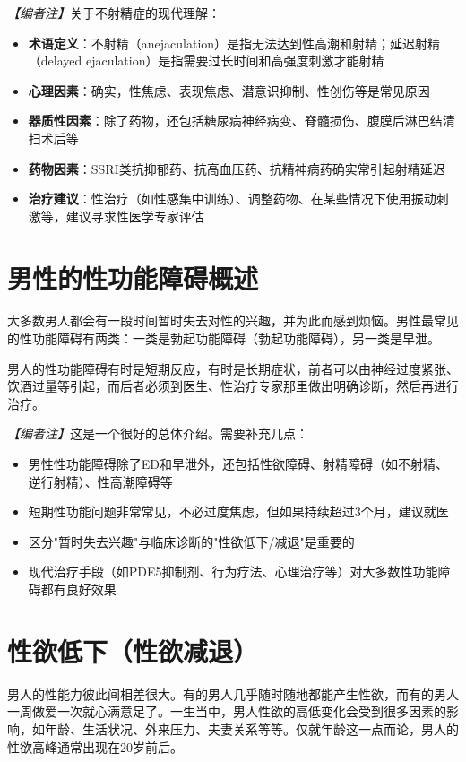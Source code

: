 \noindent\textit{【编者注】}关于不射精症的现代理解：
\begin{itemize}
	\item \textbf{术语定义}：不射精（anejaculation）是指无法达到性高潮和射精；延迟射精（delayed ejaculation）是指需要过长时间和高强度刺激才能射精
	\item \textbf{心理因素}：确实，性焦虑、表现焦虑、潜意识抑制、性创伤等是常见原因
	\item \textbf{器质性因素}：除了药物，还包括糖尿病神经病变、脊髓损伤、腹膜后淋巴结清扫术后等
	\item \textbf{药物因素}：SSRI类抗抑郁药、抗高血压药、抗精神病药确实常引起射精延迟
	\item \textbf{治疗建议}：性治疗（如性感集中训练）、调整药物、在某些情况下使用振动刺激等，建议寻求性医学专家评估
\end{itemize}

\section{男性的性功能障碍概述}

大多数男人都会有一段时间暂时失去对性的兴趣，并为此而感到烦恼。男性最常见的性功能障碍有两类：一类是勃起功能障碍（勃起功能障碍），另一类是早泄。

男人的性功能障碍有时是短期反应，有时是长期症状，前者可以由神经过度紧张、饮酒过量等引起，而后者必须到医生、性治疗专家那里做出明确诊断，然后再进行治疗。

\noindent\textit{【编者注】}这是一个很好的总体介绍。需要补充几点：
\begin{itemize}
	\item 男性性功能障碍除了ED和早泄外，还包括性欲障碍、射精障碍（如不射精、逆行射精）、性高潮障碍等
	\item 短期性功能问题非常常见，不必过度焦虑，但如果持续超过3个月，建议就医
	\item 区分"暂时失去兴趣"与临床诊断的"性欲低下/减退"是重要的
	\item 现代治疗手段（如PDE5抑制剂、行为疗法、心理治疗等）对大多数性功能障碍都有良好效果
\end{itemize}

\section{性欲低下（性欲减退）}

男人的性能力彼此间相差很大。有的男人几乎随时随地都能产生性欲，而有的男人一周做爱一次就心满意足了。一生当中，男人性欲的高低变化会受到很多因素的影响，如年龄、生活状况、外来压力、夫妻关系等等。仅就年龄这一点而论，男人的性欲高峰通常出现在20岁前后。

